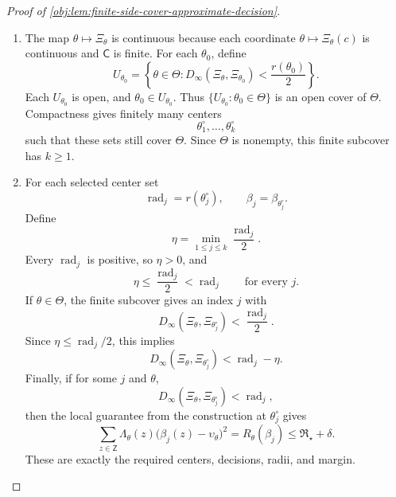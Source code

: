 \begin{proof}[Proof of \cref{obj:lem:finite-side-cover-approximate-decision}]
\begin{enumerate}
Apply the convergence with \(\mathfrak b=V_{\mathrm{fib}}(\theta_0)+\delta/2\). Choose an integer \(N_{\theta_0}\ge0\) with
\[
V_{1/(N_{\theta_0}+1)}(\theta_0)
<
V_{\mathrm{fib}}(\theta_0)+\delta/2 .
\]
Set
\[
r(\theta_0)=\frac1{N_{\theta_0}+1}>0 .
\]
Together with \(V_{\mathrm{fib}}(\theta_0)\le\mathfrak R_\star\), this gives
\[
V_{r(\theta_0)}(\theta_0)<\mathfrak R_\star+\delta .
\]
Since all risks are nonnegative, the range of worst-case risks over admissible decisions is bounded below by \(0\). Hence the strict inequality for the infimum yields a decision
\[
\beta_{\theta_0}:\mathsf Z\to[l,u]
\]
such that
\[
\sup_{\theta:\,D_\infty(\Xi_\theta,\Xi_{\theta_0})\le r(\theta_0)}
R_\theta(\beta_{\theta_0})
<
\mathfrak R_\star+\delta .
\]
Consequently, whenever
\[
D_\infty(\Xi_\theta,\Xi_{\theta_0})<r(\theta_0),
\]
the same \(\theta\) belongs to the closed neighborhood, and therefore
\[
R_\theta(\beta_{\theta_0})\le \mathfrak R_\star+\delta .
\]

\item The map \(\theta\mapsto\Xi_\theta\) is continuous because each coordinate \(\theta\mapsto\Xi_\theta(c)\) is continuous and \(\mathsf C\) is finite. For each \(\theta_0\), define
\[
U_{\theta_0}
=
\left\{\theta\in\Theta:
D_\infty(\Xi_\theta,\Xi_{\theta_0})<\frac{r(\theta_0)}2
\right\}.
\]
Each \(U_{\theta_0}\) is open, and \(\theta_0\in U_{\theta_0}\). Thus \(\{U_{\theta_0}:\theta_0\in\Theta\}\) is an open cover of \(\Theta\). Compactness gives finitely many centers
\[
\theta^\circ_1,\ldots,\theta^\circ_k
\]
such that these sets still cover \(\Theta\). Since \(\Theta\) is nonempty, this finite subcover has \(k\ge1\). %

\item For each selected center set
\[
\operatorname{rad}_j=r(\theta^\circ_j),
\qquad
\beta_j=\beta_{\theta^\circ_j}.
\]
Define
\[
\eta=\min_{1\le j\le k}\frac{\operatorname{rad}_j}{2}.
\]
Every \(\operatorname{rad}_j\) is positive, so \(\eta>0\), and
\[
\eta\le \frac{\operatorname{rad}_j}{2}<\operatorname{rad}_j
\qquad\text{for every }j.
\]
If \(\theta\in\Theta\), the finite subcover gives an index \(j\) with
\[
D_\infty(\Xi_\theta,\Xi_{\theta^\circ_j})
<
\frac{\operatorname{rad}_j}{2}.
\]
Since \(\eta\le\operatorname{rad}_j/2\), this implies
\[
D_\infty(\Xi_\theta,\Xi_{\theta^\circ_j})
<
\operatorname{rad}_j-\eta .
\]
Finally, if for some \(j\) and \(\theta\),
\[
D_\infty(\Xi_\theta,\Xi_{\theta^\circ_j})<\operatorname{rad}_j,
\]
then the local guarantee from the construction at \(\theta^\circ_j\) gives
\[
\sum_{z\in\mathsf Z}\Lambda_\theta(z)
\bigl(\beta_j(z)-\upsilon_\theta\bigr)^2
=
R_\theta(\beta_j)
\le \mathfrak R_\star+\delta .
\]
These are exactly the required centers, decisions, radii, and margin. %
\end{enumerate}
\end{proof}
